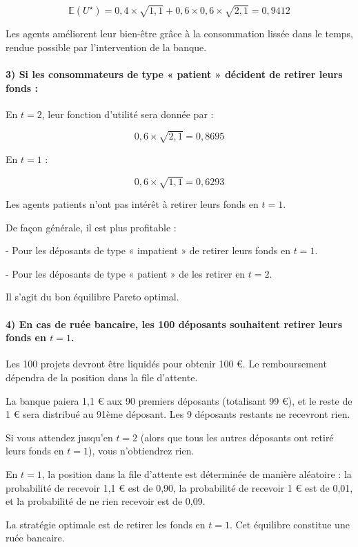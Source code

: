 \documentclass[a4paper, 12pt]{report}
\begin{document}
\[
\mathbb{E}(U^{\star}) = 0,4 \times \sqrt{1,1}+0,6 \times 0,6 \times \sqrt{2,1}=0,9412
\]

Les agents améliorent leur bien-être grâce à la consommation lissée dans le temps, rendue possible par l'intervention de la banque.

\paragraph{3) Si les consommateurs de type « patient » décident de retirer leurs fonds :}

En \( t=2 \), leur fonction d’utilité sera donnée par :

\[
0,6 \times \sqrt{2,1}=0,8695
\]

 \noindent En \( t=1 \) :

\[ 0,6 \times \sqrt{1,1} = 0,6293\]

 \noindent Les agents patients n’ont pas intérêt à retirer leurs fonds en \( t=1 \). 

 \noindent De façon générale, il est plus profitable :

- Pour les déposants de type « impatient » de retirer leurs fonds en \( t=1 \).

- Pour les déposants de type « patient » de les retirer en \( t=2 \).

 \noindent Il s’agit du bon équilibre Pareto optimal.
 
\paragraph{4) En cas de ruée bancaire, les 100 déposants souhaitent retirer leurs fonds en \( t=1 \).} 

Les 100 projets devront être liquidés pour obtenir 100 €. Le remboursement dépendra de la position dans la file d'attente.

La banque paiera 1,1 € aux 90 premiers déposants (totalisant 99 €), et le reste de 1 € sera distribué au 91ème déposant. Les 9 déposants restants ne recevront rien.

Si vous attendez jusqu’en \( t=2 \) (alors que tous les autres déposants ont retiré leurs fonds en \( t=1 \)), vous n’obtiendrez rien.

En \( t=1 \), la position dans la file d’attente est déterminée de manière aléatoire : la probabilité de recevoir 1,1 € est de 0,90, la probabilité de recevoir 1 € est de 0,01, et la probabilité de ne rien recevoir est de 0,09.

La stratégie optimale est de retirer les fonds en \( t=1 \). Cet équilibre constitue une ruée bancaire.
\end{document}
